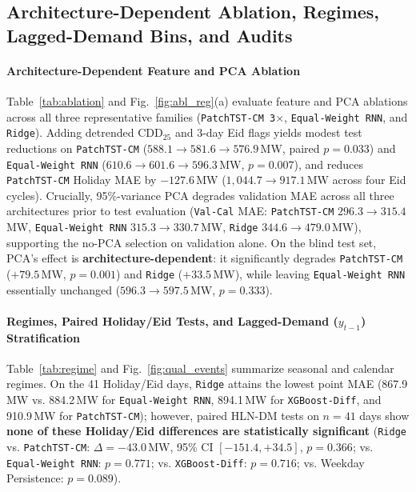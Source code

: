 \documentclass[5p,twocolumn,authoryear]{elsarticle}
\begin{document}
\FloatBarrier

\subsection{Architecture-Dependent Ablation, Regimes, Lagged-Demand Bins, and Audits}
\label{sec:audits}

\paragraph{Architecture-Dependent Feature and PCA Ablation}
Table~\ref{tab:ablation} and Fig.~\ref{fig:abl_reg}(a) evaluate feature and PCA ablations across all three representative families (\texttt{PatchTST-CM 3$\times$}, \texttt{Equal-Weight RNN}, and \texttt{Ridge}). Adding detrended $\text{CDD}_{25}$ and 3-day Eid flags yields modest test reductions on \texttt{PatchTST-CM} ($588.1 \to 581.6 \to 576.9$\,MW, paired $p = 0.033$) and \texttt{Equal-Weight RNN} ($610.6 \to 601.6 \to 596.3$\,MW, $p = 0.007$), and reduces \texttt{PatchTST-CM} Holiday MAE by $-127.6$\,MW ($1,044.7 \to 917.1$\,MW across four Eid cycles). Crucially, 95\%-variance PCA degrades validation MAE across all three architectures prior to test evaluation (\texttt{Val-Cal} MAE: \texttt{PatchTST-CM} $296.3 \to 315.4$\,MW, \texttt{Equal-Weight RNN} $315.3 \to 330.7$\,MW, \texttt{Ridge} $344.6 \to 479.0$\,MW), supporting the no-PCA selection on validation alone. On the blind test set, PCA's effect is \textbf{architecture-dependent}: it significantly degrades \texttt{PatchTST-CM} ($+79.5$\,MW, $p = 0.001$) and \texttt{Ridge} ($+33.5$\,MW), while leaving \texttt{Equal-Weight RNN} essentially unchanged ($596.3 \to 597.5$\,MW, $p = 0.333$).

\paragraph{Regimes, Paired Holiday/Eid Tests, and Lagged-Demand ($y_{t-1}$) Stratification}
Table~\ref{tab:regime} and Fig.~\ref{fig:qual_events} summarize seasonal and calendar regimes. On the 41 Holiday/Eid days, \texttt{Ridge} attains the lowest point MAE (867.9\,MW vs. 884.2\,MW for \texttt{Equal-Weight RNN}, 894.1\,MW for \texttt{XGBoost-Diff}, and 910.9\,MW for \texttt{PatchTST-CM}); however, paired HLN-DM tests on $n=41$ days show \textbf{none of these Holiday/Eid differences are statistically significant} (\texttt{Ridge} vs. \texttt{PatchTST-CM}: $\Delta = -43.0$\,MW, 95\% CI $[-151.4, +34.5]$, $p = 0.366$; vs. \texttt{Equal-Weight RNN}: $p = 0.771$; vs. \texttt{XGBoost-Diff}: $p = 0.716$; vs. Weekday Persistence: $p = 0.089$).
\end{document}
